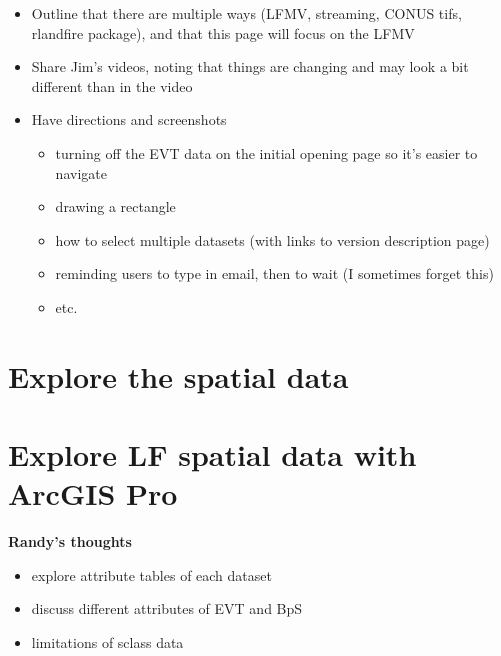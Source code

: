 \documentclass[
  letterpaper,
  DIV=11,
  numbers=noendperiod]{scrreprt}
\providecommand{\tightlist}{%
  \setlength{\itemsep}{0pt}\setlength{\parskip}{0pt}}\usepackage{longtable,booktabs,array}
\begin{document}
\begin{itemize}
\tightlist
\item
  Outline that there are multiple ways (LFMV, streaming, CONUS tifs,
  rlandfire package), and that this page will focus on the LFMV
\item
  Share Jim's videos, noting that things are changing and may look a bit
  different than in the video
\item
  Have directions and screenshots

  \begin{itemize}
  \tightlist
  \item
    turning off the EVT data on the initial opening page so it's easier
    to navigate
  \item
    drawing a rectangle
  \item
    how to select multiple datasets (with links to version description
    page)
  \item
    reminding users to type in email, then to wait (I sometimes forget
    this)
  \item
    etc.
  \end{itemize}
\end{itemize}


\hypertarget{explore-the-spatial-data}{%
\chapter{Explore the spatial data}\label{explore-the-spatial-data}}


\hypertarget{explore-lf-spatial-data-with-arcgis-pro}{%
\chapter{Explore LF spatial data with ArcGIS
Pro}\label{explore-lf-spatial-data-with-arcgis-pro}}

\textbf{Randy's thoughts}

\begin{itemize}
\tightlist
\item
  explore attribute tables of each dataset
\item
  discuss different attributes of EVT and BpS
\item
  limitations of sclass data
\end{itemize}

\end{document}

